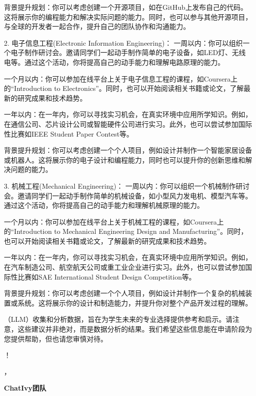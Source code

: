 \documentclass[12pt]{article}
\begin{document}
\begin{CJK*}{UTF8}{gbsn}
背景提升规划：你可以考虑创建一个开源项目，如在GitHub上发布自己的代码。这将展示你的编程能力和解决实际问题的能力。同时，也可以参与其他开源项目，与全球的开发者一起合作，提升自己的团队协作和沟通能力。

2. 电子信息工程(Electronic Information Engineering)：
一周以内：你可以组织一个电子制作研讨会。邀请同学们一起动手制作简单的电子设备，如LED灯、无线电等。通过这个活动，你将提高自己的动手能力和理解电路原理的能力。

一个月以内：你可以参加在线平台上关于电子信息工程的课程，如Coursera上的“Introduction to Electronics”。同时，也可以开始阅读相关书籍或论文，了解最新的研究成果和技术趋势。

一年以内：在一年内，你可以寻找实习机会，在真实环境中应用所学知识。例如，在通信公司、芯片设计公司或智能硬件公司进行实习。此外，也可以尝试参加国际性比赛如IEEE Student Paper Contest等。

背景提升规划：你可以考虑创建一个个人项目，例如设计并制作一个智能家居设备或机器人。这将展示你的电子设计和编程能力，同时也可以提升你的创新思维和解决问题的能力。

3. 机械工程(Mechanical Engineering)：
一周以内：你可以组织一个机械制作研讨会。邀请同学们一起动手制作简单的机械设备，如小型风力发电机、模型汽车等。通过这个活动，你将提高自己的动手能力和理解机械原理的能力。

一个月以内：你可以参加在线平台上关于机械工程的课程，如Coursera上的“Introduction to Mechanical Engineering Design and Manufacturing”。同时，也可以开始阅读相关书籍或论文，了解最新的研究成果和技术趋势。

一年以内：在一年内，你可以寻找实习机会，在真实环境中应用所学知识。例如，在汽车制造公司、航空航天公司或重工业企业进行实习。此外，也可以尝试参加国际性比赛如SAE International Student Design Competition等。

背景提升规划：你可以考虑创建一个个人项目，例如设计并制作一个复杂的机械装置或系统。这将展示你的设计和制造能力，并提升你对整个产品开发过程的理解。


   \bigskip
   \bigskip
   \bigskip
   （LLM）收集和分析数据，旨在为学生未来的专业选择提供参考和启示。请注意，这些建议并非绝对，而是数据分析的结果。我们希望这些信息能在申请阶段为您提供帮助，但也请您审慎对待。

   \bigskip 
   ！

   ，

   \noindent\textbf{ChatIvy团队}

\printbibliography
\clearpage\end{CJK*}
\end{document}
